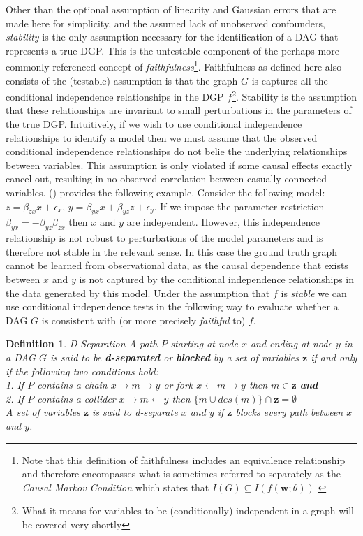 \documentclass{article}
\newtheorem{definition}{Definition}
\begin{document}
Other than the optional assumption of linearity and Gaussian errors that are made here for simplicity, and the assumed lack of unobserved confounders, \textit{stability} is the only assumption necessary for the identification of a DAG that represents a true DGP. This is the untestable component of the perhaps more commonly referenced concept of \textit{faithfulness}\footnote{Note that this definition of faithfulness includes an equivalence relationship and therefore encompasses what is sometimes referred to separately as the \textit{Causal Markov Condition} which states that $I(G) \subseteq I(f(\mathbf{w};\theta))$ \parencite{spirtes2016causal}}. Faithfulness as defined here also consists of the (testable) assumption is that the graph $G$ is captures all the conditional independence relationships in the DGP $f$\footnote{What it means for variables to be (conditionally) independent in a graph will be covered very shortly}. Stability is the assumption that these relationships are invariant to small perturbations in the parameters of the true DGP. Intuitively, if we wish to use conditional independence relationships to identify a model then we must assume that the observed conditional independence relationships do not belie the underlying relationships between variables. This assumption is only violated if some causal effects exactly cancel out, resulting in no observed correlation between casually connected variables. \citeauthor{pearl2009causality} (\citeyear{pearl2009causality}) provides the following example. Consider the following model: $z = \beta_{zx} x + \epsilon_x$, $ y = \beta_{yx} x + \beta_{yz} z + \epsilon_y$. If we impose the parameter restriction $\beta_{yx} = -\beta_{yz}\beta_{zx}$ then $x$ and $y$ are independent. However, this independence relationship is not robust to perturbations of the model parameters and is therefore not stable in the relevant sense. In this case the ground truth graph cannot be learned from observational data, as the causal dependence that exists between $x$ and $y$ is not captured by the conditional independence relationships in the data generated by this model. Under the assumption that $f$ is \textit{stable} we can use conditional independence tests in the following way to evaluate whether a DAG $G$ is consistent with (or more precisely \textit{faithful} to) $f$.

\begin{definition}{D-Separation}
  A path $P$ starting at node $x$ and ending at node $y$ in a DAG $G$ is said to be \textbf{d-separated} or \textbf{blocked} by a set of variables $\mathbf{z}$ if and only if the following two conditions hold: \\
  1. If $P$ contains a chain $x \rightarrow m \rightarrow y$ or fork $x \leftarrow m \rightarrow y$ then $m \in \mathbf{z}$ \textbf{and} \\
  2. If $P$ contains a collider $x \rightarrow m \leftarrow y$ then $\{m \cup des(m)\} \cap \mathbf{z} = \emptyset$ \\
  A set of variables $\mathbf{z}$ is said to \textit{d-separate} $x$ and $y$ if $\mathbf{z}$ blocks every path between $x$ and $y$.
  \parencite[p.16]{pearl2009causality}
  \label{dseparation}
\end{definition}
\end{document}
